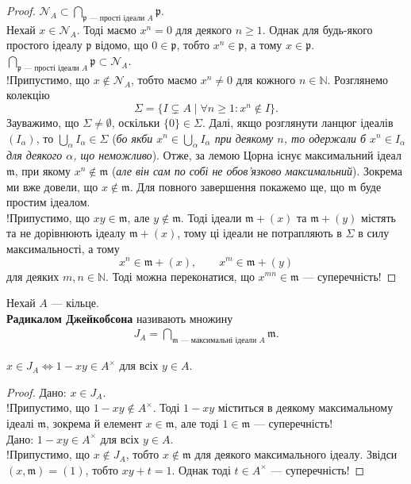 \documentclass{math_library}
\begin{document}
\begin{proof}
$\mathcal{N}_A \subset \bigcap_{\mathfrak{p} \text{ --- прості ідеали $A$}} \mathfrak{p}$.\\
Нехай $x \in \mathcal{N}_A$. Тоді маємо $x^n = 0$ для деякого $n \geq 1$. Однак для будь-якого простого ідеалу $\mathfrak{p}$ відомо, що $0 \in \mathfrak{p}$, тобто $x^n \in \mathfrak{p}$, а тому $x \in \mathfrak{p}$.
\bigskip \\
$\bigcap_{\mathfrak{p} \text{ --- прості ідеали $A$}} \mathfrak{p} \subset \mathcal{N}_A$.\\
!Припустимо, що $x \notin \mathcal{N}_A$, тобто маємо $x^n \neq 0$ для кожного $n \in \mathbb{N}$. Розглянемо колекцію
\[
\Sigma = \{ I \subsetneq A \mid \forall n \geq 1: x^n \notin I \}.
\]
Зауважимо, що $\Sigma \neq \emptyset$, оскільки $\{0\} \in \Sigma$. Далі, якщо розглянути ланцюг ідеалів $(I_\alpha)$, то $\bigcup_{\alpha} I_\alpha \in \Sigma$ (\textit{бо якби $x^n \in \bigcup_{\alpha} I_\alpha$ при деякому $n$, то одержали б $x^n \in I_\alpha$ для деякого $\alpha$, що неможливо}). Отже, за лемою Цорна існує максимальний ідеал $\mathfrak{m}$, при якому $x^n \notin \mathfrak{m}$ (\textit{але він сам по собі не обов'язково максимальний}). Зокрема ми вже довели, що $x \notin \mathfrak{m}$. Для повного завершення покажемо ще, що $\mathfrak{m}$ буде простим ідеалом.\\
!Припустимо, що $xy \in \mathfrak{m}$, але $y \notin \mathfrak{m}$. Тоді ідеали $\mathfrak{m} + (x)$ та $\mathfrak{m} + (y)$ містять та не дорівнюють ідеалу $\mathfrak{m} + (x)$, тому ці ідеали не потрапляють в $\Sigma$ в силу максимальності, а тому
\[
x^n \in \mathfrak{m} + (x), \qquad x^m \in \mathfrak{m} + (y)
\]
для деяких $m,n \in \mathbb{N}$. Тоді можна переконатися, що $x^{mn} \in \mathfrak{m}$ --- суперечність!
\end{proof}

\begin{definition}
Нехай $A$ --- кільце.\\
\textbf{Радикалом Джейкобсона} називають множину
\begin{align*}
J_A = \bigcap_{\mathfrak{m} \text{ --- максимальні ідеали $A$}} \mathfrak{m}.
\end{align*}
\end{definition}

\begin{proposition}
$x \in J_A \iff 1-xy \in A^\times$ для всіх $y \in A$.
\end{proposition}

\begin{proof}
\rightproof Дано: $x \in J_A$.\\
!Припустимо, що $1-xy \notin A^\times$. Тоді $1-xy$ міститься в деякому максимальному ідеалі $\mathfrak{m}$, зокрема й елемент $x \in \mathfrak{m}$, але тоді $1 \in \mathfrak{m}$ --- суперечність!
\bigskip \\
\leftproof Дано: $1-xy \in A^\times$ для всіх $y \in A$.\\
!Припустимо, що $x \notin J_A$, тобто $x \notin \mathfrak{m}$ для деякого максимального ідеалу. Звідси $(x,\mathfrak{m}) = (1)$, тобто $xy + t = 1$. Однак тоді $t \in A^\times$ --- суперечність! 
\end{proof}
\end{document}
